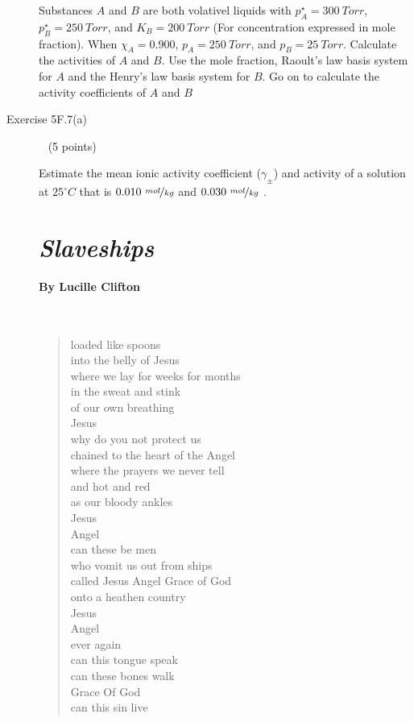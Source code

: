\documentclass[12pt, openany, letterpaper]{memoir}
\begin{document}
\begin{description}
Substances $A$ and $B$ are both volativel liquids with $p_A^\star=300~Torr$, $p_B^\star=250~Torr$, and $K_B=200~Torr$ (For concentration expressed in mole fraction). When $\chi_A=0.900$, $p_A=250~Torr$, and $p_B=25~Torr$. Calculate the activities of $A$ and $B$. Use the mole fraction, Raoult's law basis system for $A$ and the Henry's law basis system for $B$. Go on to calculate the activity coefficients of $A$ and $B$
	
	\vspace{20em}
	\item [Exercise 5F.7(a)] ~ (5 points)
	
	Estimate the mean ionic activity coefficient ($\gamma_\pm$) and activity of a solution at $25^\circ C$ that is $0.010~\nicefrac{mol}{kg}$  and $0.030~\nicefrac{mol}{kg}$ .
	
	\vspace{18em}

	
\newpage
\pagestyle{empty}
\addtocounter{page}{-1}	
\section*{\emph{Slaveships}}
\paragraph{By Lucille Clifton}~
\begin{verse}
	loaded like spoons\\
	into the belly of Jesus\\
	where we lay for weeks for months\\
	in the sweat and stink\\
	of our own breathing\\
	Jesus\\
	why do you not protect us\\
	chained to the heart of the Angel\\
	where the prayers we never tell\\
	and hot and red\\
	as our bloody ankles\\
	Jesus\\
	Angel\\
	can these be men\\
	who vomit us out from ships\\
	called Jesus    Angel    Grace of God\\
	onto a heathen country\\
	Jesus\\
	Angel\\
	ever again\\
	can this tongue speak\\
	can these bones walk\\
	Grace Of God\\
	can this sin live
\end{verse}
\end{description}
\end{document}
